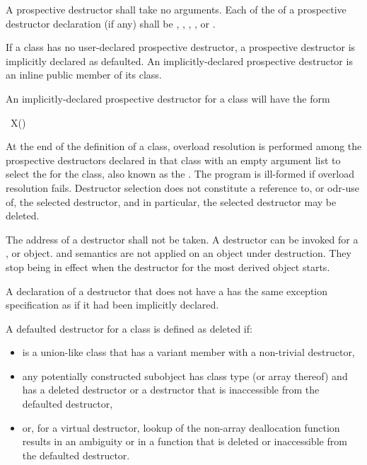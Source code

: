 A prospective destructor shall take no arguments.
Each  of the 
of a prospective destructor declaration (if any)
shall be
,
,
,
, or
.

\pnum
{}%
%
If a class has no user-declared
prospective destructor,
a prospective destructor is implicitly
declared as defaulted.
An implicitly-declared prospective destructor is an
inline public member of its class.

\pnum
An implicitly-declared prospective destructor for a class  will have the form
\begin{codeblock}
~X()
\end{codeblock}

\pnum
At the end of the definition of a class,
overload resolution is performed
among the prospective destructors declared in that class
with an empty argument list
to select the  for the class,
also known as the .
The program is ill-formed if overload resolution fails.
Destructor selection does not constitute
a reference to,
or odr-use of,
the selected destructor,
and in particular,
the selected destructor may be deleted.

\pnum
{}%
The address of a destructor shall not be taken.
%
%
A destructor can be invoked for a
,
or
object.
and
semantics are not applied on an object under destruction.
They stop being in effect when the destructor for the
most derived object starts.

\pnum
\begin{note}
A declaration of a destructor that does not have a 
has the same exception specification as if it had been implicitly declared.
\end{note}

\pnum
A defaulted destructor for a class
   is defined as deleted if:
\begin{itemize}
\item {} is a union-like class that has a variant
  member with a non-trivial destructor,

\item any potentially constructed subobject has class type
   (or array thereof) and
   has a deleted destructor or a destructor
  that is inaccessible from the defaulted destructor,

\item or, for a virtual destructor, lookup of the non-array deallocation
  function results in an ambiguity or in a function that is deleted or
  inaccessible from the defaulted destructor.
\end{itemize}

